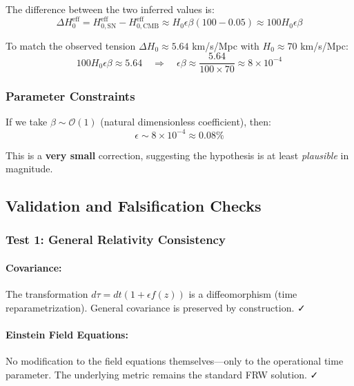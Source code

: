The difference between the two inferred values is:
\begin{equation}
\Delta H_0^{\text{eff}} = H_{0,\text{SN}}^{\text{eff}} - H_{0,\text{CMB}}^{\text{eff}} \approx H_0 \epsilon \beta (100 - 0.05) \approx 100 H_0 \epsilon \beta
\label{eq:delta_h0_eff}
\end{equation}

To match the observed tension $\Delta H_0 \approx 5.64$ km/s/Mpc with $H_0 \approx 70$ km/s/Mpc:
\begin{equation}
100 H_0 \epsilon \beta \approx 5.64 \quad \Rightarrow \quad \epsilon \beta \approx \frac{5.64}{100 \times 70} \approx 8 \times 10^{-4}
\label{eq:epsilon_beta_required}
\end{equation}

\subsubsection{Parameter Constraints}

If we take $\beta \sim \mathcal{O}(1)$ (natural dimensionless coefficient), then:
\begin{equation}
\epsilon \sim 8 \times 10^{-4} \approx 0.08\%
\label{eq:epsilon_required}
\end{equation}

This is a \textbf{very small} correction, suggesting the hypothesis is at least \textit{plausible} in magnitude.

\subsection{Validation and Falsification Checks}

\subsubsection{Test 1: General Relativity Consistency}

\paragraph{Covariance:}
The transformation $d\tau = dt(1 + \epsilon f(z))$ is a diffeomorphism (time reparametrization). General covariance is preserved by construction. ✓

\paragraph{Einstein Field Equations:}
No modification to the field equations themselves—only to the operational time parameter. The underlying metric remains the standard FRW solution. ✓

